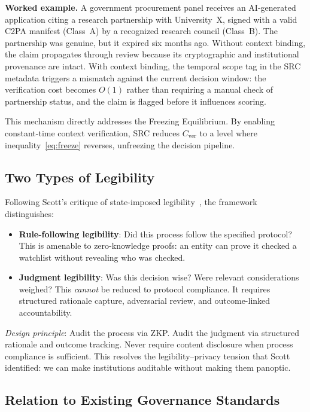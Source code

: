 \documentclass[runningheads]{llncs}
\begin{document}
\textbf{Worked example.} A government procurement panel receives an AI-generated application citing a research partnership with University~X, signed with a valid C2PA manifest (Class~A) by a recognized research council (Class~B). The partnership was genuine, but it expired six months ago. Without context binding, the claim propagates through review because its cryptographic and institutional provenance are intact. With context binding, the temporal scope tag in the SRC metadata triggers a mismatch against the current decision window: the verification cost becomes $O(1)$ rather than requiring a manual check of partnership status, and the claim is flagged before it influences scoring.

This mechanism directly addresses the Freezing Equilibrium. By enabling constant-time context verification, SRC reduces $C_{\mathrm{ver}}$ to a level where inequality~\eqref{eq:freeze} reverses, unfreezing the decision pipeline.

\subsection{Two Types of Legibility}

Following Scott's critique of state-imposed legibility~\cite{scott1998seeing,rao2010legibility}, the framework distinguishes:

\begin{itemize}
\item \textbf{Rule-following legibility}: Did this process follow the specified protocol? This is amenable to zero-knowledge proofs: an entity can prove it checked a watchlist without revealing who was checked.
\item \textbf{Judgment legibility}: Was this decision wise? Were relevant considerations weighed? This \emph{cannot} be reduced to protocol compliance. It requires structured rationale capture, adversarial review, and outcome-linked accountability.
\end{itemize}

\emph{Design principle}: Audit the process via ZKP. Audit the judgment via structured rationale and outcome tracking. Never require content disclosure when process compliance is sufficient. This resolves the legibility--privacy tension that Scott identified: we can make institutions auditable without making them panoptic.

\subsection{Relation to Existing Governance Standards}
\end{document}
